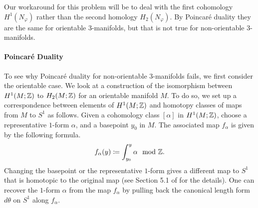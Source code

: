 Our workaround for this problem will be to deal with the first cohomology $H^1(N_{\varphi})$ rather than the second homology $H_2(N_{\varphi})$.
By Poincar\'e duality they are the same for orientable 3-manifolds, but that is not true for non-orientable $3$-manifolds.

\paragraph{Poincar\'e Duality}
To see why Poincar\'e duality for non-orientable 3-manifolds fails, we first consider the orientable case.
We look at a construction of the isomorphism between $H^1(M; \mathbb{Z})$ to $H_2(M; \mathbb{Z})$ for an orientable manifold $M$.  To do so, we set up a correspondence between elements of $H^1(M; \mathbb{Z})$ and homotopy classes of maps from $M$ to $S^1$ as follows.
Given a cohomology class $[\alpha]$ in $H^1(M; \mathbb{Z})$, choose a representative $1$-form $\alpha$, and a basepoint $y_0$ in $M$.
The associated map $f_{\alpha}$ is given by the following formula.
\begin{align}\label{form:map}
  f_{\alpha}(y) \coloneqq  \int_{y_0}^y \alpha \mod {\mathbb{Z}}.
\end{align}
Changing the basepoint or the representative $1$-form gives a different map to $S^1$ that is homotopic to the original map (see Section 5.1 of \cite{calegari2007foliations} for the details).
One can recover the $1$-form $\alpha$ from the map $f_{\alpha}$ by pulling back the canonical length form $d\theta$ on $S^1$ along $f_{\alpha}$.

